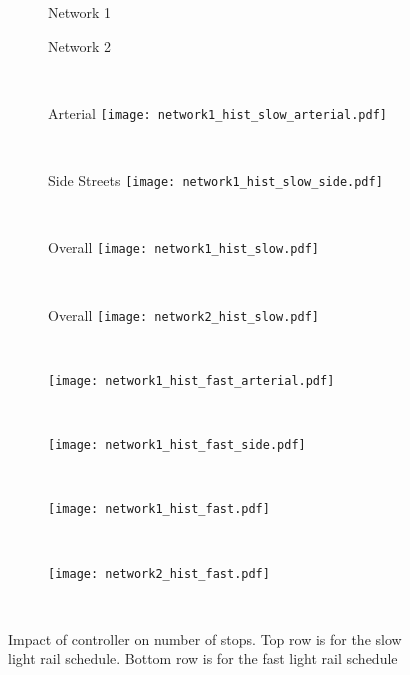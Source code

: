 \begin{figure*}[t!] \centering
%
\begin{subfigure}{0.68\textwidth}
  \centering
  \footnotesize{Network 1}
\end{subfigure}
\begin{subfigure}{0.2\textwidth}
  \centering
  \footnotesize{Network 2}
\end{subfigure}\\[2mm]
\begin{subfigure}{0.275\textwidth}
  \centering
  \qquad \qquad \footnotesize{Arterial}
\texttt{[image: network1\_hist\_slow\_arterial.pdf]}
\caption{~}\label{fig:network1_slow:hist:arterial}
\end{subfigure}
%
\begin{subfigure}{0.2\textwidth}
  \centering
  \footnotesize{Side Streets}
\texttt{[image: network1\_hist\_slow\_side.pdf]}
\caption{~}\label{fig:network1_slow:hist:side}
\end{subfigure}
%
\begin{subfigure}{0.2\textwidth}
  \centering
  \footnotesize{Overall}
\texttt{[image: network1\_hist\_slow.pdf]}
\caption{~}\label{fig:network1_slow:hist}
\end{subfigure}
%
\begin{subfigure}{0.2\textwidth}
  \centering
  \footnotesize{Overall}
\texttt{[image: network2\_hist\_slow.pdf]}
\caption{~}\label{fig:network2_slow:hist}
\end{subfigure}
%
\begin{subfigure}{0.28\textwidth}
\texttt{[image: network1\_hist\_fast\_arterial.pdf]}
\caption{~}\label{fig:nwrwork1_fast:hist:arterial}
\end{subfigure}
\begin{subfigure}{0.2\textwidth}
\texttt{[image: network1\_hist\_fast\_side.pdf]}
\caption{~}\label{fig:network1_fast:hist:side}
\end{subfigure}
\begin{subfigure}{0.2\textwidth}
\texttt{[image: network1\_hist\_fast.pdf]}
\caption{~}\label{fig:network1_fast:hist}
\end{subfigure}
\begin{subfigure}{0.2\textwidth}
\texttt{[image: network2\_hist\_fast.pdf]}
\caption{~}\label{fig:network2_fast:hist}
\end{subfigure}
\vspace{-2mm}
\caption{Impact of controller on number of stops. Top row is for the slow light rail schedule. Bottom row is for the fast light rail schedule}
\label{fig:network_hist}
\end{figure*}

